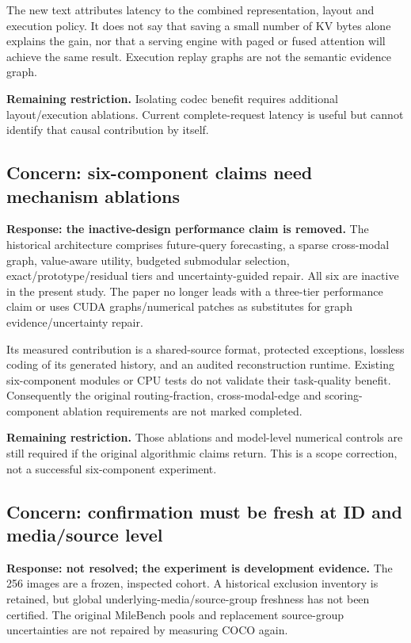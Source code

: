 \documentclass[11pt]{article}
\begin{document}
The new text attributes latency to the combined representation, layout
and execution policy. It does not say that saving a small number of KV
bytes alone explains the gain, nor that a serving engine with paged or
fused attention will achieve the same result. Execution replay graphs
are not the semantic evidence graph.

\textbf{Remaining restriction.} Isolating codec benefit requires additional
layout/execution ablations. Current complete-request latency is useful
but cannot identify that causal contribution by itself.

\subsection{Concern: six-component claims need mechanism ablations}
\textbf{Response: the inactive-design performance claim is removed.}
The historical architecture comprises future-query forecasting, a sparse
cross-modal graph, value-aware utility, budgeted submodular selection,
exact/prototype/residual tiers and uncertainty-guided repair. All six are
inactive in the present study. The paper no longer leads with a three-tier
performance claim or uses CUDA graphs/numerical patches as substitutes
for graph evidence/uncertainty repair.

Its measured contribution is a shared-source format, protected exceptions,
lossless coding of its generated history, and an audited reconstruction
runtime. Existing six-component modules or CPU tests do not validate their
task-quality benefit. Consequently the original routing-fraction,
cross-modal-edge and scoring-component ablation requirements are not
marked completed.

\textbf{Remaining restriction.} Those ablations and model-level numerical
controls are still required if the original algorithmic claims return.
This is a scope correction, not a successful six-component experiment.

\subsection{Concern: confirmation must be fresh at ID and media/source level}
\textbf{Response: not resolved; the experiment is development evidence.}
The 256 images are a frozen, inspected cohort. A historical exclusion
inventory is retained, but global underlying-media/source-group freshness
has not been certified. The original MileBench pools and replacement
source-group uncertainties are not repaired by measuring COCO again.
\end{document}
